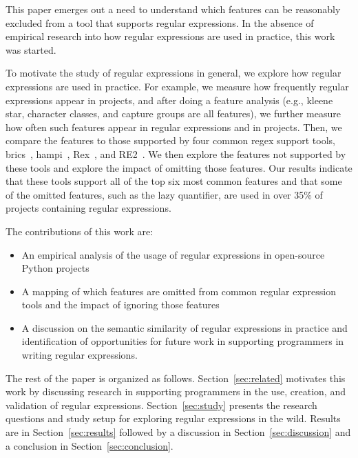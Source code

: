 This paper emerges out a need to understand which features can be reasonably excluded from a tool that supports regular expressions. In the absence of empirical research into how regular expressions are used in practice, this work was started.

To motivate the study of regular expressions in general, we explore how regular expressions are used in practice. For example, we measure how frequently regular expressions appear in projects, and after doing a feature analysis (e.g., kleene star, character classes, and capture groups are all features), we further measure how often such features appear in regular expressions and in projects. Then, we compare the features to those supported by four common regex support tools, brics~\cite{brics}, hampi~\cite{hampi}, Rex~\cite{rex}, and RE2~\cite{re2}. We then explore the features not supported by these tools and explore the impact of omitting those features. Our results indicate that these tools support all of the top six most common features and that some of the omitted features, such as the lazy quantifier, are used in over 35\% of projects containing regular expressions.

The contributions of this work are:

\begin{itemize}
	\item An empirical analysis of the usage of regular expressions in  open-source Python projects
	\item A mapping of which features are omitted from common regular expression tools and the impact of ignoring those features
	\item A discussion on the semantic similarity of regular expressions in practice and identification of opportunities for future work in supporting programmers in writing regular expressions.
\end{itemize}

The rest of the paper is organized as follows. Section~\ref{sec:related} motivates this work by discussing research in supporting programmers in the use, creation, and validation of regular expressions. Section~\ref{sec:study} presents the research questions and study setup for exploring regular expressions in the wild. Results are in Section~\ref{sec:results} followed by a discussion in Section~\ref{sec:discussion} and a conclusion in Section~\ref{sec:conclusion}.
